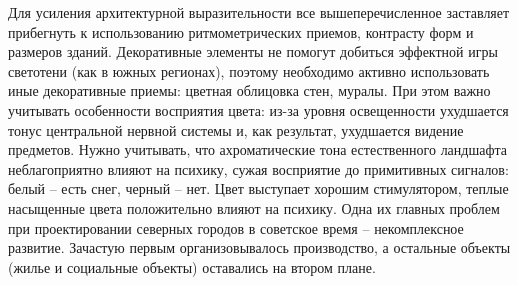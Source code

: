 Для усиления архитектурной выразительности все вышеперечисленное заставляет прибегнуть к использованию ритмометрических приемов, контрасту форм и размеров зданий. Декоративные элементы не помогут добиться эффектной игры светотени (как в южных регионах), поэтому необходимо активно использовать иные декоративные приемы: цветная облицовка стен, муралы. При этом важно учитывать особенности восприятия цвета: из-за уровня освещенности ухудшается тонус центральной нервной системы и, как результат, ухудшается видение предметов. Нужно учитывать, что ахроматические тона естественного ландшафта неблагоприятно влияют на психику, сужая восприятие до примитивных сигналов: белый – есть снег, черный – нет. Цвет выступает хорошим стимулятором, теплые насыщенные цвета положительно влияют на психику.
Одна их главных проблем при проектировании северных городов в советское время – некомплексное развитие. Зачастую первым организовывалось производство, а остальные объекты (жилье и социальные объекты) оставались на втором плане.
